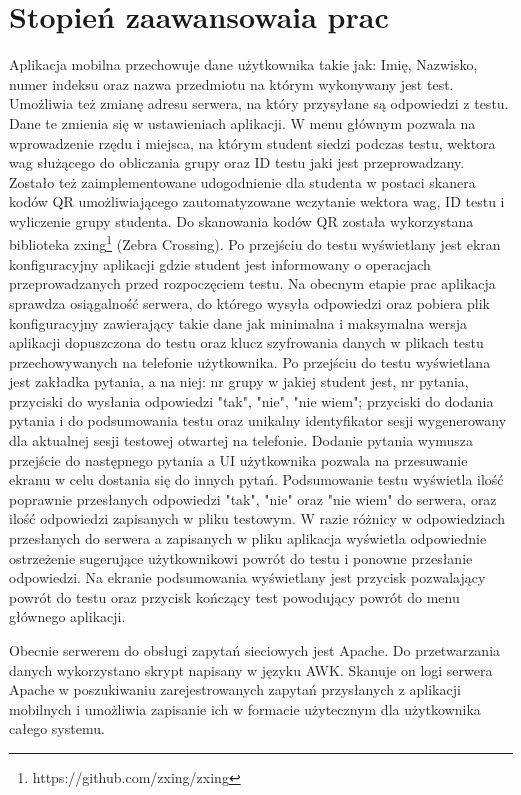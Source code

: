 \documentclass{report}
\begin{document}
	\chapter{Stopień zaawansowaia prac}
	
	Aplikacja mobilna przechowuje dane użytkownika takie jak: Imię, Nazwisko, numer indeksu oraz nazwa przedmiotu na którym wykonywany jest test. Umożliwia też zmianę adresu serwera, na który przysyłane są odpowiedzi z testu. Dane te zmienia się w ustawieniach aplikacji. W menu głównym pozwala na wprowadzenie rzędu i miejsca, na którym student siedzi podczas testu, wektora wag służącego do obliczania grupy oraz ID testu jaki jest przeprowadzany. Zostało też zaimplementowane udogodnienie dla studenta w postaci skanera kodów QR umożliwiającego zautomatyzowane wczytanie wektora wag, ID testu i wyliczenie grupy studenta. Do skanowania kodów QR została wykorzystana biblioteka zxing\footnote{https://github.com/zxing/zxing} (Zebra Crossing). Po przejściu do testu wyświetlany jest ekran konfiguracyjny aplikacji gdzie student jest informowany o operacjach przeprowadzanych przed rozpoczęciem testu. Na obecnym etapie prac aplikacja sprawdza osiągalność serwera, do którego wysyła odpowiedzi oraz pobiera plik konfiguracyjny zawierający takie dane jak minimalna i maksymalna wersja aplikacji dopuszczona do testu oraz klucz szyfrowania danych w plikach testu przechowywanych na telefonie użytkownika. Po przejściu do testu wyświetlana jest zakładka pytania, a na niej: nr grupy w jakiej student jest, nr pytania, przyciski do wysłania odpowiedzi "tak", "nie", "nie wiem"; przyciski do dodania pytania i do podsumowania testu oraz unikalny identyfikator sesji wygenerowany dla aktualnej sesji testowej otwartej na telefonie. Dodanie pytania wymusza przejście do następnego pytania a UI użytkownika pozwala na przesuwanie ekranu w celu dostania się do innych pytań. Podsumowanie testu wyświetla ilość poprawnie przesłanych odpowiedzi "tak", "nie" oraz "nie wiem" do serwera, oraz ilość odpowiedzi zapisanych w pliku testowym. W razie różnicy w odpowiedziach przesłanych do serwera a zapisanych w pliku aplikacja wyświetla odpowiednie ostrzeżenie sugerujące użytkownikowi powrót do testu i ponowne przesłanie odpowiedzi. Na ekranie podsumowania wyświetlany jest przycisk pozwalający powrót do testu oraz przycisk kończący test powodujący powrót do menu głównego aplikacji.
	
	Obecnie serwerem do obsługi zapytań sieciowych jest Apache. Do przetwarzania danych wykorzystano skrypt napisany w języku AWK. Skanuje on logi serwera Apache w poszukiwaniu zarejestrowanych zapytań przysłanych z aplikacji mobilnych i umożliwia zapisanie ich w formacie użytecznym dla użytkownika całego systemu.
	
\end{document}
